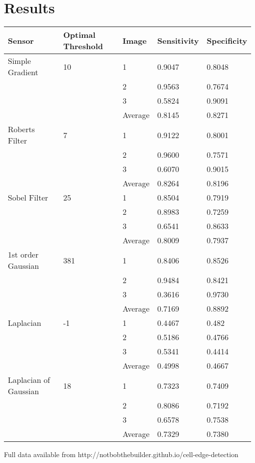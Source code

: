 \documentclass[12pt]{article}
\begin{document}
  \section{Results}
  \begin{center}
    \begin{tabular}{|l|l|l|l| l |}
      \hline
      Sensor & Optimal Threshold & Image & Sensitivity & Specificity\\
      \hline
      Simple Gradient & 10 &  1 & 0.9047 & 0.8048\\
                          &&  2 & 0.9563 & 0.7674\\
                          &&  3 & 0.5824 & 0.9091\\
                     && Average & 0.8145 & 0.8271\\\hline
      Roberts Filter & 7 & 1 & 0.9122 & 0.8001\\
                        && 2 & 0.9600 & 0.7571\\
                        && 3 & 0.6070 & 0.9015\\
                  && Average & 0.8264 & 0.8196\\\hline
      Sobel Filter & 25 & 1 & 0.8504 & 0.7919\\
                      &&  2 & 0.8983 & 0.7259\\
                      &&  3 & 0.6541 & 0.8633\\
                  && Average & 0.8009 & 0.7937\\\hline
      1st order Gaussian & 381 & 1 & 0.8406 & 0.8526\\
                              && 2 & 0.9484 & 0.8421\\
                              && 3 & 0.3616 & 0.9730\\
                        && Average & 0.7169 & 0.8892\\\hline
      Laplacian & -1 & 1 & 0.4467 & 0.482\\
                    && 2 & 0.5186 & 0.4766\\
                    && 3 & 0.5341 & 0.4414\\
              && Average & 0.4998 & 0.4667\\\hline
      Laplacian of Gaussian & 18 & 1 & 0.7323 & 0.7409\\
                                && 2 & 0.8086 & 0.7192\\
                                && 3 & 0.6578 & 0.7538\\
                          && Average & 0.7329 & 0.7380\\\hline
    \end{tabular}

    Full data available from http://notbobthebuilder.github.io/cell-edge-detection
  \end{center}
\end{document}
